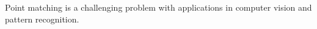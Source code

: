 \documentclass[11pt,bezier,]{article}
\begin{document}
Point matching %
is a  challenging  problem with applications in 
computer vision and pattern recognition. 
\end{document}
